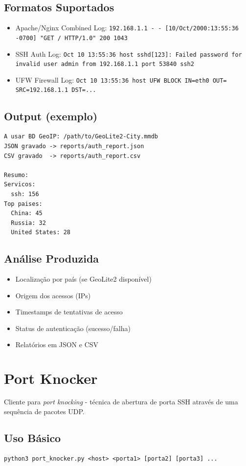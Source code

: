 \documentclass[11pt,a4paper]{article}
\begin{document}
\subsection{Formatos Suportados}
\begin{itemize}
  \item Apache/Nginx Combined Log: \texttt{192.168.1.1 - - [10/Oct/2000:13:55:36 -0700] "GET / HTTP/1.0" 200 1043}
  \item SSH Auth Log: \texttt{Oct 10 13:55:36 host sshd[123]: Failed password for invalid user admin from 192.168.1.1 port 53840 ssh2}
  \item UFW Firewall Log: \texttt{Oct 10 13:55:36 host UFW BLOCK IN=eth0 OUT= SRC=192.168.1.1 DST=...}
\end{itemize}

\subsection{Output (exemplo)}
\begin{lstlisting}[style=bash]
A usar BD GeoIP: /path/to/GeoLite2-City.mmdb
JSON gravado -> reports/auth_report.json
CSV gravado  -> reports/auth_report.csv

Resumo:
Servicos:
  ssh: 156
Top paises:
  China: 45
  Russia: 32
  United States: 28
\end{lstlisting}

\subsection{An\'alise Produzida}
\begin{itemize}
  \item Localiza\c{c}\~ao por pa\'is (se GeoLite2 dispon\'ivel)
  \item Origem dos acessos (IPs)
  \item Timestamps de tentativas de acesso
  \item Status de autentica\c{c}\~ao (sucesso/falha)
  \item Relat\'orios em JSON e CSV
\end{itemize}

\section{Port Knocker}
Cliente para \textit{port knocking} - t\'ecnica de abertura de porta SSH atrav\'es de uma sequ\^encia de pacotes UDP.

\subsection{Uso B\'asico}
\begin{lstlisting}[style=bash]
python3 port_knocker.py <host> <porta1> [porta2] [porta3] ...
\end{lstlisting}
\end{document}
